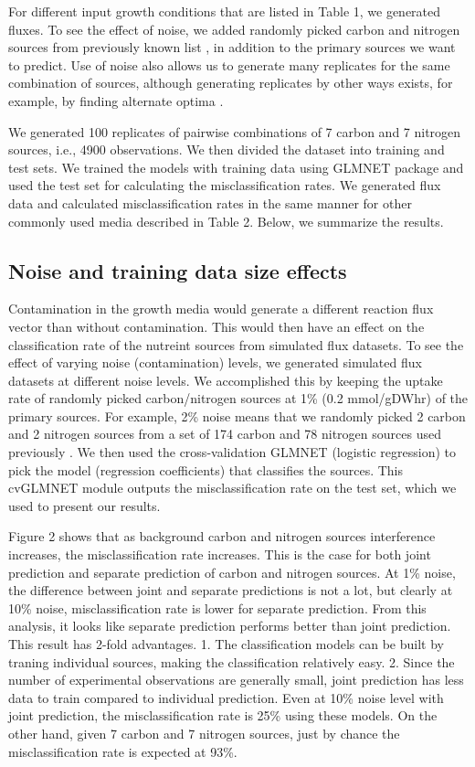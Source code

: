 \documentclass[12pt]{article}
\begin{document}
\bigskip
\noindent
For different input growth conditions that are listed in Table 1, we generated fluxes. To see the effect of noise, we added randomly picked carbon and nitrogen sources from previously known list \cite{Feistetal2007}, in addition to the primary sources we want to predict. Use of noise also allows us to generate many replicates for the same combination of sources, although generating replicates by other ways exists, for example, by finding alternate optima \cite{MahadevanSchilling2003}.

\bigskip
\noindent
We generated 100 replicates of pairwise combinations of 7 carbon and 7 nitrogen sources, i.e., 4900 observations. We then divided the dataset into training and test sets. We trained the models with training data using GLMNET package and used the test set for calculating the misclassification rates. We generated flux data and calculated misclassification rates in the same manner for other commonly used media described in Table 2. Below, we summarize the results.

\bigskip
\subsection*{Noise and training data size effects}
 Contamination in the growth media would generate a different reaction flux vector than without contamination. This would then have an effect on the classification rate of the nutreint sources from simulated flux datasets. To see the effect of varying noise (contamination) levels, we generated simulated flux datasets at different noise levels. We accomplished this by keeping the uptake rate of randomly picked carbon/nitrogen sources at 1\% (0.2 mmol/gDWhr) of the primary sources. For example, 2\% noise means that we randomly picked 2 carbon and 2 nitrogen sources from a set of 174 carbon and 78 nitrogen sources used previously \cite{Feistetal2007}. We then used the cross-validation GLMNET (logistic regression) to pick the model (regression coefficients) that classifies the sources. This cvGLMNET module outputs the misclassification rate on the test set, which we used to present our results.

\bigskip
\noindent
Figure 2 shows that as background carbon and nitrogen sources interference increases, the misclassification rate increases. This is the case for both joint prediction and separate prediction of carbon and nitrogen sources. At 1\% noise, the difference between joint and separate predictions is not a lot, but clearly at 10\% noise, misclassification rate is lower for separate prediction. From this analysis, it looks like separate prediction performs better than joint prediction. This result has 2-fold advantages. 1. The classification models can be built by traning individual sources, making the classification relatively easy. 2. Since the number of experimental observations are generally small, joint prediction has less data to train compared to individual prediction. Even at 10\% noise level with joint prediction, the misclassification rate is 25\% using these models. On the other hand, given 7 carbon and 7 nitrogen sources, just by chance the misclassification rate is expected at 93\%.
\end{document}
